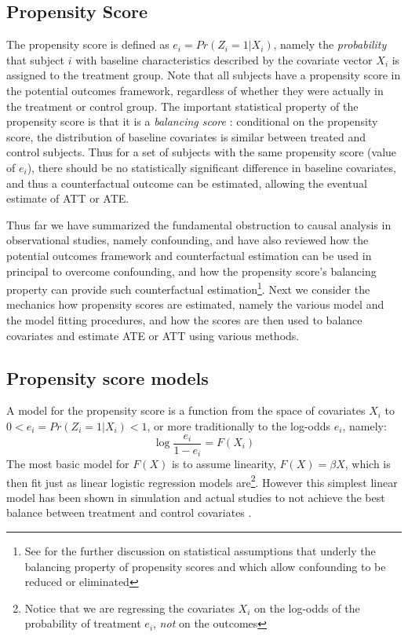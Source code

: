 \documentclass[11pt]{scrartcl}
\begin{document}
\subsection*{Propensity Score}
The propensity score is defined as $e_i=Pr(Z_i=1|X_i)$, namely the \emph{probability} that subject $i$ with baseline characteristics described by the covariate vector $X_i$ is assigned to the treatment group.  Note that all subjects have a propensity score in the potential outcomes framework, regardless of whether they were actually in the treatment or control group.  The important statistical property of the propensity score is that it is a \emph{balancing score} \cite{austin2011introduction}: conditional on the propensity score, the distribution of baseline covariates is similar between treated and control subjects.  Thus for a set of subjects with the same propensity score (value of $e_i$), there should be no statistically significant difference in baseline covariates, and thus a counterfactual outcome can be estimated, allowing the eventual estimate of ATT or ATE.  

Thus far we have summarized the fundamental obstruction to causal analysis in observational studies, namely confounding, and have also reviewed how the potential outcomes framework and counterfactual estimation can be used in principal to overcome confounding, and how the propensity score's balancing property can provide such counterfactual estimation\footnote{See \cite{austin2011introduction} for the further discussion on statistical assumptions that underly the balancing property of propensity scores and which allow confounding to be reduced or eliminated}.  Next we consider the mechanics how propensity scores are estimated, namely the various model and the model fitting procedures, and how the scores are then used to balance covariates and estimate ATE or ATT using various methods.  

\subsection*{Propensity score models}
A model for the propensity score is a function from the space of covariates $X_i$ to $0<e_i=Pr(Z_i=1|X_i)<1$, or more traditionally to the log-odds $e_i$, namely:  
\begin{equation}
\log\frac{e_i}{1-e_i}=F(X_i)
\end{equation}
The most basic model for $F(X)$ is to assume linearity, $F(X)=\beta X$, which is then fit just as linear logistic regression models are\footnote{Notice that we are regressing the covariates $X_i$ on the log-odds of the probability of treatment $e_i$, \emph{not} on the outcomes}. However this simplest linear model has been shown in simulation and actual studies to not achieve the best balance between treatment and control covariates .  
\end{document}
